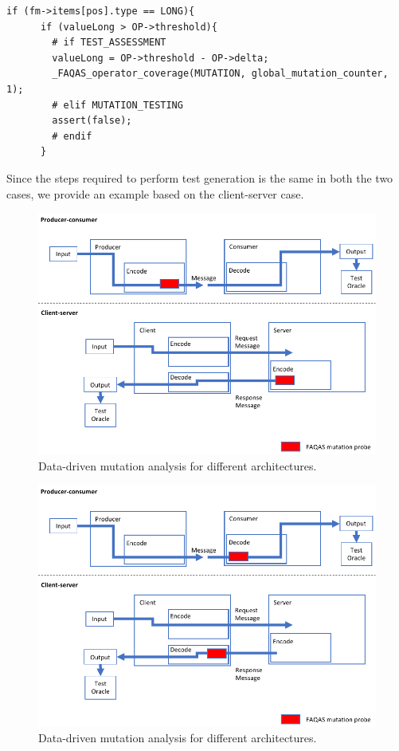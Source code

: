 \begin{lstlisting}[style=CStyle, float=t, caption=\_FAQAS\_mutate excerpt., label=assert]
if (fm->items[pos].type == LONG){
      if (valueLong > OP->threshold){
      	# if TEST_ASSESSMENT
        valueLong = OP->threshold - OP->delta;
        _FAQAS_operator_coverage(MUTATION, global_mutation_counter, 1); 
        # elif MUTATION_TESTING
        assert(false);
        # endif
      }
\end{lstlisting}


Since the steps required to perform test generation is the same in both the two cases, we provide an example based on the client-server case.

\begin{figure}[h]
  \centering
    \includegraphics[width=14cm]{images/dataDrivenTestSuiteAugmentationC}
      \caption{Data-driven mutation analysis for different architectures.}
      \label{fig:dataDrivenTestSuiteAugmentationC}
\end{figure}

\begin{figure}[h]
  \centering
    \includegraphics[width=14cm]{images/dataDrivenTestSuiteAugmentationD}
      \caption{Data-driven mutation analysis for different architectures.}
      \label{fig:dataDrivenTestSuiteAugmentationD}
\end{figure}

